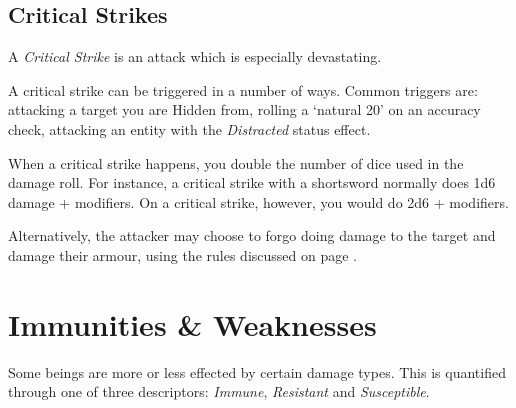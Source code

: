 







\subsection{Critical Strikes}\label{S:Sneak}

A {\it Critical Strike} is an attack which is especially devastating. 

A critical strike can be triggered in a number of ways. Common triggers are: attacking a target you are Hidden from, rolling a `natural 20' on an accuracy check, attacking an entity with the {\it Distracted} status effect. 

When a critical strike happens, you double the number of dice used in the damage roll. For instance, a critical strike with a shortsword normally does 1d6 damage + modifiers. On a critical strike, however, you would do 2d6 + modifiers. 

Alternatively, the attacker may choose to forgo doing damage to the target and damage their armour, using the rules discussed on page \pageref{S:DestroyArmour}.

\section{Immunities \& Weaknesses}

Some beings are more or less effected by certain damage types. This is quantified through one of three descriptors: {\it Immune}, {\it Resistant} and {\it Susceptible}. 

